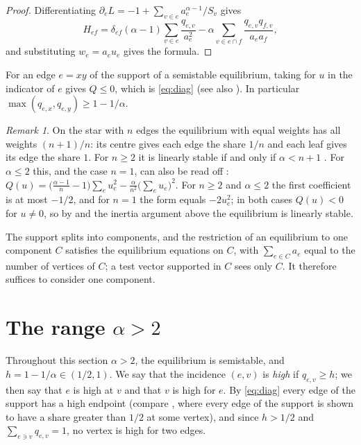 \documentclass[11pt]{article}
\theoremstyle{definition}
\theoremstyle{remark}
\newtheorem{remark}[theorem]{Remark}
\begin{document}
\begin{proof}
Differentiating $\partial_eL=-1+\sum_{v\in e}a_e^{\alpha-1}/S_v$ gives
\[
  H_{ef}=\delta_{ef}(\alpha-1)\sum_{v\in e}\frac{q_{e,v}}{a_e^2}
        -\alpha\sum_{v\in e\cap f}\frac{q_{e,v}q_{f,v}}{a_ea_f},
\]
and substituting $w_e=a_eu_e$ gives the formula.
\end{proof}

For an edge $e=xy$ of the support of a semistable equilibrium, taking for $u$ in  the indicator of $e$
gives $Q\le 0$, which is \eqref{eq:diag} (see also \cite[(5)]{Kr}). In particular $\max(q_{e,x},q_{e,y})\ge 1-1/\alpha$.

\begin{remark}\label{rem:star}
On the star with $n$ edges the equilibrium with equal weights has all weights $(n+1)/n$: its centre gives each
edge the share $1/n$ and each leaf gives its edge the share $1$. For $n\ge 2$ it is linearly stable if and only if
$\alpha<n+1$ \cite[Theorem~3.3]{vdHHKR}. For $\alpha\le 2$ this, and the case $n=1$, can also be read off
:
$Q(u)=\bigl(\frac{\alpha-1}{n}-1\bigr)\sum_e u_e^2-\frac{\alpha}{n^2}\bigl(\sum_e u_e\bigr)^2$. For $n\ge 2$ and
$\alpha\le 2$ the first coefficient is at most $-1/2$, and for $n=1$ the form equals $-2u_e^2$; in both cases $Q(u)<0$
for $u\ne 0$, so by  and the inertia argument above the equilibrium is linearly stable.
\end{remark}

The support splits into components, and the restriction of an equilibrium to one component $C$ satisfies the
equilibrium equations on $C$, with $\sum_{e\in C}a_e$ equal to the number of vertices of $C$; a test vector
supported in $C$ sees only $C$. It therefore suffices to consider one component.

\section{\texorpdfstring{The range $\alpha>2$}{The range alpha > 2}}\label{sec:large}

Throughout this section $\alpha>2$, the equilibrium is semistable, and $h=1-1/\alpha\in(1/2,1)$. We say that the
incidence $(e,v)$ is \emph{high} if $q_{e,v}\ge h$; we then say that $e$ is high at $v$ and that $v$ is high
for $e$. By \eqref{eq:diag} every edge of the support has a high endpoint (compare \cite[Theorem~4]{HK}, where
every edge of the support is shown to have a share greater than $1/2$ at some vertex), and
since $h>1/2$ and $\sum_{e\ni v}q_{e,v}=1$, no vertex is high for two edges.
\end{document}
